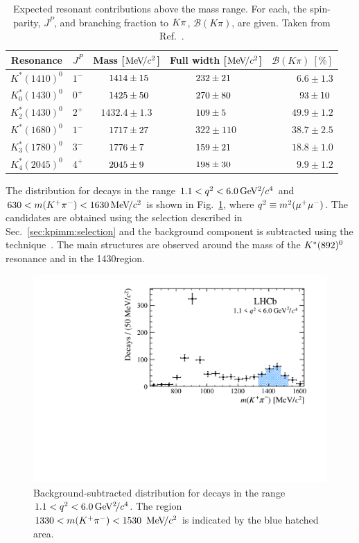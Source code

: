 \begin{table}[!tb]
\caption{Expected resonant contributions above the \KstP mass range. For each, the spin-parity, $J^P$, and branching fraction to ${K}{\pi}$, $\mathcal{B}(K\pi)$, are given. Taken from Ref.~\cite{lu-wang}.}
\label{tab:introduction:states}
\centering
\begin{tabular}{c|c|c|c|r}
    Resonance & $J^{P}$ & Mass [$\mathrm{Me\kern -0.1em V\!/}c^2$] & Full width [$\mathrm{Me\kern -0.1em V\!/}c^2$]  & $\mathcal{B}(K\pi)~[\%]$ \\
   \hline
   $K^\ast(1410)^0$ & $1^{-}$& $\hphantom{0.}1414 \pm 15\hphantom{.}$& $232 \pm 21\hphantom{0}$  & $6.6 \pm 1.3$ \\
   $K^\ast_0(1430)^0$ & $0^{+}$ & $\hphantom{0.}1425 \pm 50\hphantom{.}$ & $270 \pm 80\hphantom{0}$ & $\hphantom{.}93 \pm 10\hphantom{.}$ \\
   $K^\ast_2(1430)^0$ & $2^{+}$ & $1432.4\pm 1.3$ & $109 \pm 5\hphantom{00}$ & $49.9 \pm 1.2$ \\
   $K^\ast(1680)^0$ & $1^{-}$ & $\hphantom{0.}1717 \pm 27\hphantom{.}$ & $322 \pm 110$ & $38.7 \pm 2.5$ \\
   $K^\ast_3(1780)^0$ & $3^{-}$ & $\hphantom{0.}1776 \pm 7\hphantom{0.}$ & $159 \pm 21\hphantom{0}$ & $18.8 \pm 1.0$ \\
   $K^\ast_4(2045)^0$ & $4^{+}$ & $\hphantom{0.}2045 \pm 9\hphantom{0.}$ & $198 \pm 30\hphantom{0}$ & $9.9 \pm 1.2$ \\
 \end{tabular}
 \end{table}

The \mkpi distribution for \BdToKpimm decays in the range $1.1<{q^2}<6.0{\mathrm{\,Ge\kern -0.1em V^2\!/}c^4}$ and $630<m({{K}^+}{{\pi}^-})<1630{\mathrm{\,Me\kern -0.1em V\!/}c^2}$ is shown in Fig.~\ref{fig:full-mkpi}, where ${q^2} \equiv m^2({\mu^+} {\mu^-})$. The candidates are obtained using the selection described in Sec.~\ref{sec:kpimm:selection} and the background component is subtracted using the \sPlot technique~\cite{splot}. The main structures are observed around the mass of the ${{K}^*}(892)^{0}$ resonance and in the 1430\mevcc region. 

\begin{figure}[!tb]
 \centering
 \includegraphics[width=0.7\linewidth]{figs/kpimm/introduction/full-mkpi.pdf}
 \caption{Background-subtracted \mkpi distribution for \BdToKpimm decays in the range $1.1<{q^2}<6.0{\mathrm{\,Ge\kern -0.1em V^2\!/}c^4}$. The region $1330<m({{K}^+}{{\pi}^-})<1530~{\mathrm{\,Me\kern -0.1em V\!/}c^2}$ is indicated by the blue hatched area.}
\label{fig:full-mkpi}
\end{figure}

